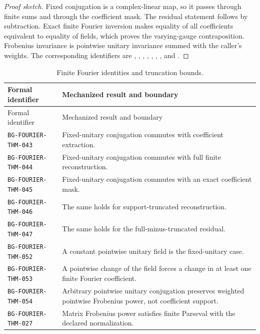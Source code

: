 \documentclass[11pt]{article}
\begin{document}
\begin{proof}[Proof sketch]
Fixed conjugation is a complex-linear map, so it passes through finite sums and through
the coefficient mask. The residual statement follows by subtraction. Exact finite
Fourier inversion makes equality of all coefficients equivalent to equality of fields,
which proves the varying-gauge contraposition. Frobenius invariance is pointwise unitary
invariance summed with the caller's weights. The corresponding identifiers are
, ,
, ,
, ,
, and .
\end{proof}

\begin{center}\small
\begin{longtable}{@{}>{\raggedright\arraybackslash}p{}
                         >{\raggedright\arraybackslash}p{}@{}}
\caption{Finite Fourier identities and truncation bounds.}
\label{tab:formal-fourier}\\
\toprule
Formal identifier & Mechanized result and boundary \\
\midrule
\endfirsthead
\toprule
Formal identifier & Mechanized result and boundary \\
\midrule
\endhead
\texttt{BG-FOURIER-THM-043} & Fixed-unitary conjugation commutes with coefficient extraction. \\
\texttt{BG-FOURIER-THM-044} & Fixed-unitary conjugation commutes with full finite reconstruction. \\
\texttt{BG-FOURIER-THM-045} & Fixed-unitary conjugation commutes with an exact coefficient mask. \\
\texttt{BG-FOURIER-THM-046} & The same holds for support-truncated reconstruction. \\
\texttt{BG-FOURIER-THM-047} & The same holds for the full-minus-truncated residual. \\
\texttt{BG-FOURIER-THM-052} & A constant pointwise unitary field is the fixed-unitary case. \\
\texttt{BG-FOURIER-THM-053} & A pointwise change of the field forces a change in at least one finite Fourier coefficient. \\
\texttt{BG-FOURIER-THM-054} & Arbitrary pointwise unitary conjugation preserves weighted pointwise Frobenius power, not coefficient support. \\
\texttt{BG-FOURIER-THM-027} & Matrix Frobenius power satisfies finite Parseval with the declared normalization. \\

\end{longtable}
\end{center}
\end{document}
